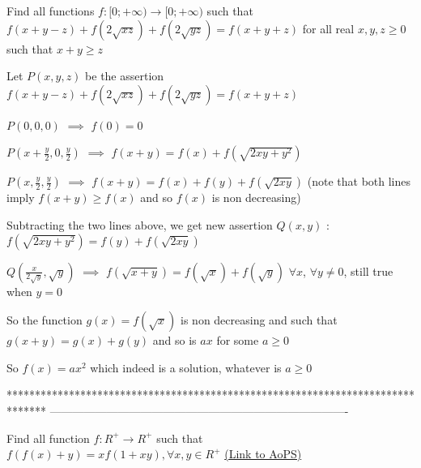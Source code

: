 \begin{solution}
	\begin{tcolorbox}Find all functions ${{f: \mathbb[0;+\infty)}\to\mathbb[0;+\infty)}$ such that  $f(x+y-z)+f(2\sqrt{xz})+f(2\sqrt{yz})=f(x+y+z)$ for all real $x,y,z{\ge}0$ such that $x+y{\ge}z$\end{tcolorbox}
Let $P(x,y,z)$ be the assertion $f(x+y-z)+f(2\sqrt{xz})+f(2\sqrt{yz})=f(x+y+z)$

$P(0,0,0)$ $\implies$ $f(0)=0$

$P(x+\frac y2,0,\frac y2)$ $\implies$ $f(x+y)=f(x)+f(\sqrt{2xy+y^2})$ 

$P(x,\frac y2,\frac y2)$ $\implies$ $f(x+y)=f(x)+f(y)+f(\sqrt{2xy})$
(note that both lines imply $f(x+y)\ge f(x)$ and so $f(x)$ is non decreasing)

Subtracting the two lines above, we get new assertion $Q(x,y)$ : $f(\sqrt{2xy+y^2})=f(y)+f(\sqrt{2xy})$

$Q(\frac{x}{2\sqrt y},\sqrt y)$ $\implies$ $f(\sqrt{x+y})=f(\sqrt{x})+f(\sqrt{y})$ $\forall x$, $\forall y\ne 0$, still true when $y=0$

So the function $g(x)=f(\sqrt x)$ is non decreasing and such that $g(x+y)=g(x)+g(y)$ and so is $ax$ for some $a\ge 0$

So $\boxed{f(x)=ax^2}$ which indeed is a solution, whatever is $a\ge 0$
\end{solution}
*******************************************************************************
-------------------------------------------------------------------------------

\begin{problem}
	Find all function $f:R^+\rightarrow R^+$  such that
$f(f(x)+y)=xf(1+xy),\forall x,y\in R^+$
	\flushright \href{https://artofproblemsolving.com/community/c6h533460}{(Link to AoPS)}
\end{problem}



